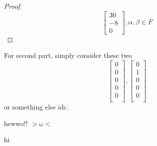 \documentclass[11pt, a4paper]{article}
\begin{document}
\begin{Class Test}
\begin{proof}
$$\begin{bmatrix}
            30\\
            -8\\
            0
        \end{bmatrix}, \alpha,\beta\in F$$
    \end{proof}
    For second part, simply consider these two
    $$\begin{bmatrix}
        0\\
        0\\
        0\\
        0\\
        0\\
    \end{bmatrix},
    \begin{bmatrix}
        0\\
        1\\
        0\\
        0\\
        0\\
    \end{bmatrix}$$ or something else idc.
    \item hewwo!! $>\omega<$ 
\end{Class Test}
\newpage
hi
\end{document}
